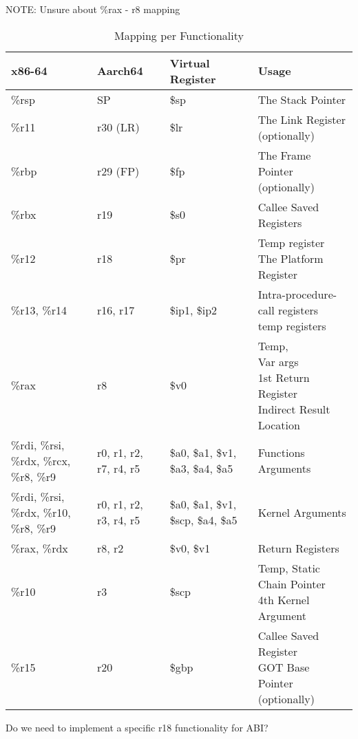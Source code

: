 \documentclass[11pt]{article}
\begin{document}
NOTE: Unsure about \%rax - r8 mapping

\begin{table}[ht]
\caption{Mapping per Functionality}
\begin{adjustwidth}{-4.3cm}{-4.3cm}
\begin{tabular}{|l|l|l|l|}
    \hline
    \textbf{x86-64} & \textbf{Aarch64} & \textbf{Virtual Register} & \textbf{Usage} \\
    \hline
    \%rsp & SP & \$sp & The Stack Pointer \\
    \hline
    \%r11 & r30 (LR) & \$lr & The Link Register (optionally) \\
    \hline
    \%rbp & r29 (FP) & \$fp & The Frame Pointer (optionally) \\
    \hline
    \%rbx & r19 & \$s0 & Callee Saved Registers \\
    \hline
    \%r12 & r18 & \$pr & \pbox{20cm}{Temp register \\ The Platform Register} \\
    \hline
    \%r13, \%r14 & r16, r17 & \$ip1, \$ip2 & \pbox{20cm}{Intra-procedure-call registers \\ temp registers} \\
    \hline
    \%rax & r8 & \$v0 & \pbox{20cm}{Temp, \\  Var args \\ 1st Return Register \\ Indirect Result Location} \\
    \hline
    \%rdi, \%rsi, \%rdx, \%rcx, \%r8, \%r9 & r0, r1, r2, r7, r4, r5 & \$a0, \$a1, \$v1, \$a3, \$a4, \$a5 & Functions Arguments \\
    \hline
    \%rdi, \%rsi, \%rdx, \%r10, \%r8, \%r9 & r0, r1, r2, r3, r4, r5 & \$a0, \$a1, \$v1, \$scp, \$a4, \$a5 & Kernel Arguments \\
    \hline
    \%rax, \%rdx & r8, r2 & \$v0, \$v1 & Return Registers \\
    \hline
    \%r10 & r3 & \$scp & \pbox{20cm}{Temp, Static Chain Pointer \\ 4th Kernel Argument} \\
    \hline
    \%r15 & r20 & \$gbp & \pbox{20cm}{Callee Saved Register \\ GOT Base Pointer (optionally)} \\
    \hline
\end{tabular}
\end{adjustwidth}\label{tab:mappings_per_func}
\end{table}

    Do we need to implement a specific r18 functionality for ABI?
\end{document}
